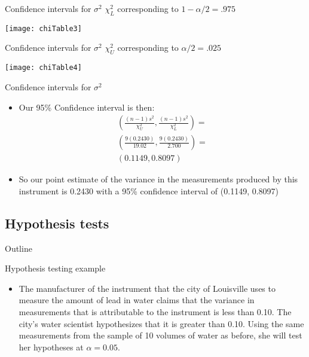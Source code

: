 \documentclass[xcolor=dvipsnames]{beamer}
\begin{document}
\begin{frame}{Confidence intervals for $\sigma^2$}
	$\chi^2_L$ corresponding to $1-\alpha / 2 = .975$
	\begin{center}
		\texttt{[image: chiTable3]}
	\end{center}
\end{frame}

\begin{frame}{Confidence intervals for $\sigma^2$}
	$\chi^2_U$ corresponding to $\alpha / 2 = .025$
	\begin{center}
		\texttt{[image: chiTable4]}
	\end{center}
\end{frame}

\begin{frame}{Confidence intervals for $\sigma^2$}
	\begin{itemize}
		\item Our 95\% Confidence interval is then:
		\begin{gather*}
		\left(\frac{(n-1) s^2}{\chi_U^2}, \frac{(n-1)s^2}{\chi_L^2} \right) = \\
		\left(\frac{9 (0.2430)}{19.02}, \frac{9 (0.2430)}{2.700} \right) = \\
		( 0.1149, 0.8097)
		\end{gather*}
		\item So our point estimate of the variance in the measurements produced by this instrument is 0.2430 with a 95\% confidence interval of (0.1149, 0.8097)
	\end{itemize}
\end{frame}

\subsection{Hypothesis tests}
\begin{frame}{Outline}
	\tableofcontents[currentsection,subsectionstyle=show/shaded/hide]
\end{frame}

\begin{frame}{Hypothesis testing example}
	\begin{itemize}
		\item The manufacturer of the instrument that the city of Louisville uses to measure the amount of lead in water claims that the variance in measurements that is attributable to the instrument is less than 0.10. The city's water scientist hypothesizes that it is greater than 0.10. Using the same measurements from the sample of 10 volumes of water as before, she will test her hypotheses at $\alpha = 0.05$. 
	\end{itemize}
\end{frame}
\end{document}
